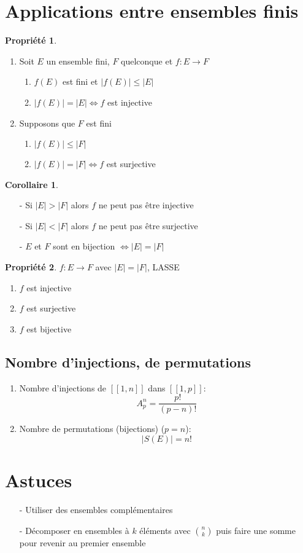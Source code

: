 \documentclass[fleqn]{article}
\theoremstyle{definition} \newtheorem*{defi}{D\'efinition}
\theoremstyle{definition} \newtheorem*{theo}{Th\'eor\`eme}
\theoremstyle{definition} \newtheorem*{coro}{Corollaire}
\theoremstyle{remark} \newtheorem*{rqs}{Remarques}
\theoremstyle{definition} \newtheorem*{prop}{Propri\'et\'e}
\begin{document}
\section{Applications entre ensembles finis}
\begin{prop} $ $
	\begin{enumerate}
		\item Soit $E$ un ensemble fini, $F$ quelconque et $f: E \rightarrow F$
			\begin{enumerate}
				\item $f(E)$ est fini et $|f(E)| \leq |E|$
				\item $|f(E)| = |E| \Leftrightarrow f$ est injective
			\end{enumerate}

		\item Supposons que $F$ est fini
			\begin{enumerate}
				\item $|f(E)| \leq |F|$
				\item $|f(E)| = |F| \Leftrightarrow f$ est surjective
			\end{enumerate}
	\end{enumerate}
\end{prop}

\begin{coro} $ $
	\begin{itemize}
		\item [-] Si $|E| > |F|$ alors $f$ ne peut pas \^etre injective
		\item [-] Si $|E| < |F|$ alors $f$ ne peut pas \^etre surjective
		\item [-] $E$ et $F$ sont en bijection $\Leftrightarrow |E| = |F|$
	\end{itemize}
\end{coro}

\begin{prop} $f: E \rightarrow F$ avec $|E| = |F|$, LASSE
	\begin{enumerate}
		\item $f$ est injective
		\item $f$ est surjective
		\item $f$ est bijective
	\end{enumerate}
\end{prop}

\subsection{Nombre d'injections, de permutations}
\begin{enumerate}
	\item Nombre d'injections de $[\![1,n]\!]$ dans $[\![1,p]\!]$:
		\[A_p^n = \frac{p!}{(p-n)!}\]
	\item Nombre de permutations (bijections) ($p=n$):
		\[|S(E)| = n!\]
\end{enumerate}

\section{Astuces}
\begin{itemize}
	\item [-] Utiliser des ensembles compl\'ementaires
	\item [-] D\'ecomposer en ensembles \`a $k$ \'el\'ements avec $\binom{n}{k}$ puis faire une somme pour revenir au premier ensemble
\end{itemize}
\end{document}
